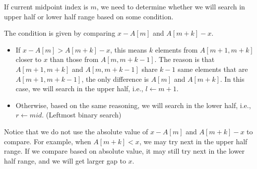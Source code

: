 If current midpoint index is $m$, we need to determine whether we will search in upper half or lower half range based on some condition.

The condition is given by comparing $x - A[m]$ and $A[m+k] - x$.

\begin{itemize}
\item If $x-A[m] > A[m+k] - x$, this means $k$ elements from $A[m+1, m+k]$ closer to $x$ than those from $A[m, m+k-1]$. The reason is that $A[m+1, m+k]$ and $A[m, m+k-1]$ share $k-1$ same elements that are $A[m+1,m+k-1]$, the only difference is $A[m]$ and $A[m+k]$. In this case, we will search in the upper half, i.e., $l\gets m+1$.
\item Otherwise, based on the same reasoning, we will search in the lower half, i.e., $r\gets mid$. (Leftmost binary search)
\end{itemize}

Notice that we do not use the absolute value of $x-A[m]$ and $A[m+k]-x$ to compare. For example, when $A[m+k]< x$, we may try next in the upper half range. If we compare based on absolute value, it may still try next in the lower half range, and we will get larger gap to $x$.

